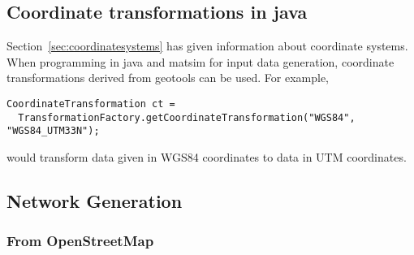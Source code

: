 \subsection{Coordinate transformations in \gls{java}}
\label{sec:programming-coordinate-systems}
Section~\ref{sec:coordinatesystems} has 
given 
information about coordinate systems.   
When 
programming in \gls{java} and \gls{matsim} for input data 
generation, coordinate transformations derived from geotools \citep{geotools-www-page} can be used.  For example, 
\begin{lstlisting}
CoordinateTransformation ct = 
  TransformationFactory.getCoordinateTransformation("WGS84", "WGS84_UTM33N");
\end{lstlisting}
would transform data given in WGS84 coordinates to data in UTM coordinates.

\subsection{Network Generation}

\subsubsection{From OpenStreetMap}
\label{sec:network-from-osm}

